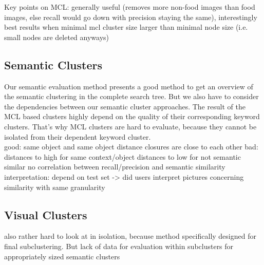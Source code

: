 \bigskip
Key points on MCL: generally useful (removes more non-food images than food images, else recall would go down with precision staying the same), interestingly best results when minimal mcl cluster size larger than minimal node size (i.e. small nodes are deleted anyways)

\subsection{Semantic Clusters}
Our semantic evaluation method presents a good method to get an overview of the semantic clustering in the complete search tree. But we also have to consider the dependencies between our semantic cluster approaches. The result of the MCL based clusters highly depend on the quality of their corresponding keyword clusters. That's why MCL clusters are hard to evaluate, because they cannot be isolated from their dependent keyword cluster.\\	
\bigskip
good: same object and same object distance closures are close to each other
bad: distances to high for same context/object 
	 distances to low for not semantic similar
	 no correlation between recall/precision and semantic similarity 
interpretation: depend on test set -> did users interpret pictures concerning similarity with same granularity

\subsection{Visual Clusters}
also rather hard to look at in isolation, because method specifically designed for final subclustering. But lack of data for evaluation within subclusters for appropriately sized semantic clusters
